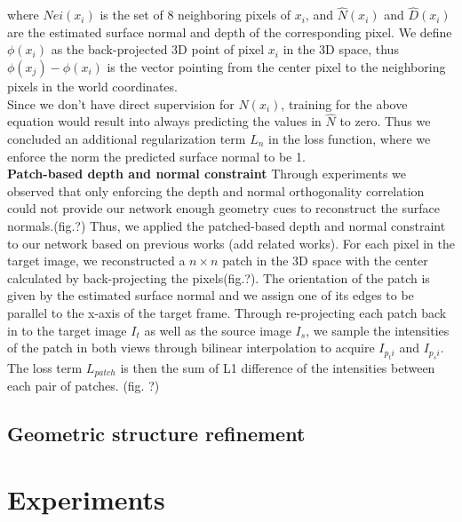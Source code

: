 \documentclass[10pt,twocolumn,letterpaper]{article}
\begin{document}
where $Nei(x_i)$ is the set of 8 neighboring pixels of $x_i$, and $\hat N(x_i)$ and $\hat D(x_i)$ are the estimated surface normal and depth of the corresponding pixel. We define $\phi(x_i)$ as the back-projected 3D point of pixel $x_i$ in the 3D space, thus $\phi(x_j) - \phi(x_i)$ is the vector pointing from the center pixel to the neighboring pixels in the world coordinates. \\
Since we don't have direct supervision for $N(x_i)$, training for the above equation would result into always predicting the values in $\hat{N}$ to zero. Thus we concluded an additional regularization term $L_n$ in the loss function, where we enforce the norm the predicted surface normal to be 1.
\\
\textbf{Patch-based depth and normal constraint} Through experiments we observed that only enforcing the depth and normal orthogonality correlation could not provide our network enough geometry cues to reconstruct the surface normals.(fig.?) Thus, we applied the patched-based depth and normal constraint to our network based on previous works (add related works). For each pixel in the target image, we reconstructed a $n\times n$ patch in the 3D space with the center calculated by back-projecting the pixels(fig.?). The orientation of the patch is given by the estimated surface normal and we assign one of its edges to be parallel to the x-axis of the target frame. Through re-projecting each patch back in to the target image $I_t$ as well as the source image $I_s$, we sample the intensities of the patch in both views through bilinear interpolation to acquire $I_{p_ti}$ and $I_{p_si}$. The loss term $L_{patch}$ is then the sum of L1 difference of the intensities between each pair of patches. (fig. ?)
\subsection{Geometric structure refinement}
\section{Experiments}
\end{document}
